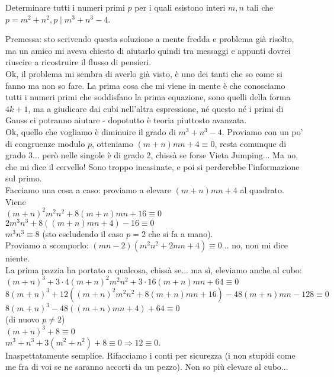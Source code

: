 \begin{prob}
  Determinare tutti i numeri primi $p$ per i quali esistono interi $m, n$ tali che $p=m^2+n^2, p \mid m^3+n^3-4$.
\end{prob}

\begin{sol}
  Premessa: sto scrivendo questa soluzione a mente fredda e problema già risolto, ma un amico mi aveva chiesto di aiutarlo quindi tra messaggi e appunti dovrei riuscire a ricostruire il flusso di pensieri. \\
  Ok, il problema mi sembra di averlo già visto, è uno dei tanti che so come si fanno ma non so fare. La prima cosa che mi viene in mente è che conosciamo tutti i numeri primi che soddisfano la prima equazione, sono quelli della forma $4k+1$, ma a giudicare dai cubi nell'altra espressione, né questo né i primi di Gauss ci potranno aiutare - dopotutto è teoria piuttosto avanzata. \\
  Ok, quello che vogliamo è diminuire il grado di $m^3+n^3-4$. Proviamo con un po' di congruenze modulo $p$, otteniamo $(m+n)mn+4 \equiv 0$, resta comunque di grado 3... però nelle singole è di grado 2, chissà se forse Vieta Jumping... Ma no, che mi dice il cervello! Sono troppo incasinate, e poi si perderebbe l'informazione sul primo. \\
  Facciamo una cosa a caso: proviamo a elevare $(m+n)mn+4$ al quadrato. Viene \\
  $(m+n)^2m^2n^2+8(m+n)mn+16 \equiv 0$ \\
  $2m^3n^3+8((m+n)mn+4)-16 \equiv 0$ \\
  $m^3n^3 \equiv 8$ (sto escludendo il caso $p=2$ che si fa a mano). \\
  Proviamo a scomporlo: $(mn-2)(m^2n^2+2mn+4) \equiv 0$... no, non mi dice niente. \\
  La prima pazzia ha portato a qualcosa, chissà se... ma sì, eleviamo anche al cubo:
  $(m+n)^3+3\cdot 4(m+n)^2m^2n^2+3 \cdot 16 (m+n)mn +64 \equiv 0$ \\
  $8(m+n)^3+12((m+n)^2m^2n^2+8(m+n)mn+16)-48(m+n)mn-128 \equiv 0$ \\
  $8(m+n)^3-48((m+n)mn+4)+64 \equiv 0$ \\
  (di nuovo $p \not = 2$) \\
  $(m+n)^3+8 \equiv 0$ \\
  $m^3+n^3+3(m^2+n^2)+8 \equiv 0 \Rightarrow 12 \equiv 0$. \\
  Inaspettatamente semplice. Rifacciamo i conti per sicurezza (i non stupidi come me fra di voi se ne saranno accorti da un pezzo). Non so più elevare al cubo... \\

\end{sol}
